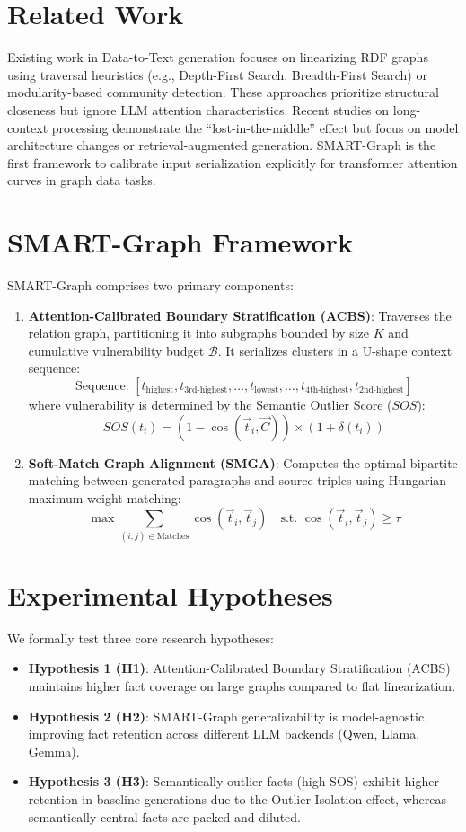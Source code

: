 \documentclass[conference]{IEEEtran}
\begin{document}
\section{Related Work}
Existing work in Data-to-Text generation focuses on linearizing RDF graphs using traversal heuristics (e.g., Depth-First Search, Breadth-First Search) or modularity-based community detection. These approaches prioritize structural closeness but ignore LLM attention characteristics. Recent studies on long-context processing demonstrate the ``lost-in-the-middle'' effect but focus on model architecture changes or retrieval-augmented generation. SMART-Graph is the first framework to calibrate input serialization explicitly for transformer attention curves in graph data tasks.

\section{SMART-Graph Framework}
SMART-Graph comprises two primary components:
\begin{enumerate}
    \item \textbf{Attention-Calibrated Boundary Stratification (ACBS)}: Traverses the relation graph, partitioning it into subgraphs bounded by size $K$ and cumulative vulnerability budget $\mathcal{B}$. It serializes clusters in a U-shape context sequence:
    $$\text{Sequence: } [t_{\text{highest}}, t_{\text{3rd-highest}}, \dots, t_{\text{lowest}}, \dots, t_{\text{4th-highest}}, t_{\text{2nd-highest}}]$$
    where vulnerability is determined by the Semantic Outlier Score ($SOS$):
    $$SOS(t_i) = \left( 1 - \cos(\vec{t}_i, \vec{C}) \right) \times \left(1 + \delta(t_i)\right)$$
    
    \item \textbf{Soft-Match Graph Alignment (SMGA)}: Computes the optimal bipartite matching between generated paragraphs and source triples using Hungarian maximum-weight matching:
    $$\max \sum_{(i,j) \in \text{Matches}} \cos(\vec{t}_i, \vec{t}_j) \quad \text{s.t. } \cos(\vec{t}_i, \vec{t}_j) \ge \tau$$
\end{enumerate}

\section{Experimental Hypotheses}
We formally test three core research hypotheses:
\begin{itemize}
    \item \textbf{Hypothesis 1 (H1)}: Attention-Calibrated Boundary Stratification (ACBS) maintains higher fact coverage on large graphs compared to flat linearization.
    \item \textbf{Hypothesis 2 (H2)}: SMART-Graph generalizability is model-agnostic, improving fact retention across different LLM backends (Qwen, Llama, Gemma).
    \item \textbf{Hypothesis 3 (H3)}: Semantically outlier facts (high SOS) exhibit higher retention in baseline generations due to the Outlier Isolation effect, whereas semantically central facts are packed and diluted.
\end{itemize}
\end{document}
